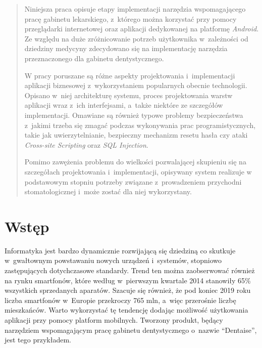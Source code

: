 \documentclass[11pt]{aghdpl}
\author{Mateusz Kulpa}
\date{2014}
\begin{document}
\titlepages

\begin{abstract}

Niniejsza praca opisuje etapy implementacji narzędzia wspomagającego pracę gabinetu lekarskiego, z~którego można korzystać przy pomocy przeglądarki internetowej oraz aplikacji dedykowanej na platformę \emph{Android}. Ze względu na duże zróżnicowanie potrzeb użytkownika w~zależności od dziedziny medycyny zdecydowano się na implementację narzędzia przeznaczonego dla gabinetu dentystycznego. 

W pracy poruszane są różne aspekty projektowania i~implementacji aplikacji biznesowej z~wykorzystaniem popularnych obecnie technologii. Opisano w~niej architekturę systemu, proces projektowania warstw aplikacji wraz z~ich interfejsami, a~także niektóre ze szczegółów implementacji. Omawiane są również typowe problemy bezpieczeństwa z~jakimi trzeba się zmagać podczas wykonywania prac programistycznych, takie jak uwierzytelnianie, bezpieczny mechanizm resetu hasła czy ataki \emph{Cross-site Scripting} oraz \emph{SQL Injection}.

Pomimo zawężenia problemu do wielkości pozwalającej skupieniu się na szczegółach projektowania i~implementacji, opisywany system realizuje w podstawowym stopniu potrzeby związane z~prowadzeniem przychodni stomatologicznej i~może zostać dla niej wykorzystany.

\end{abstract}

\setcounter{tocdepth}{2}
\tableofcontents
\clearpage


\chapter{Wstęp}
\label{cha:wstep}

Informatyka jest bardzo dynamicznie rozwijającą się dziedziną co skutkuje w~gwałtownym powstawaniu nowych urządzeń i~systemów, stopniowo zastępujących dotychczasowe standardy. Trend ten można zaobserwować również na rynku smartfonów, które według \cite{MG} w~pierwszym kwartale 2014 stanowiły 65\% wszystkich sprzedanych aparatów. Szacuje się również, że pod koniec 2019 roku liczba smartfonów w~Europie przekroczy 765 mln, a~więc przerośnie liczbę mieszkańców. Warto wykorzystać tę tendencję dodając możliwość użytkowania aplikacji przy pomocy platform mobilnych. Tworzony produkt, będący narzędziem wspomagającym pracę gabinetu dentystycznego o~nazwie ``Dentaise'', jest tego przykładem.
\end{document}
